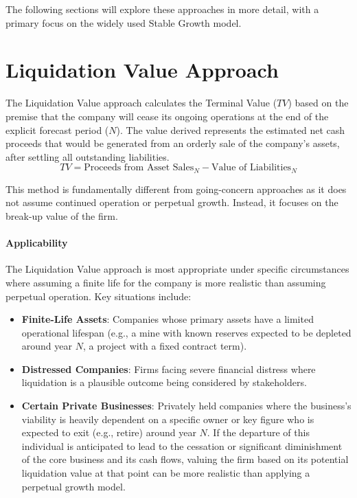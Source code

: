 The following sections will explore these approaches in more detail, with a primary focus on the widely used Stable Growth model.

\section{Liquidation Value Approach} \label{sec:liquidation_value}
The Liquidation Value approach calculates the Terminal Value (\(TV\)) based on the premise that the company will cease its ongoing operations at the end of the explicit forecast period (\(N\)). The value derived represents the estimated net cash proceeds that would be generated from an orderly sale of the company's assets, after settling all outstanding liabilities.
\[ TV = \text{Proceeds from Asset Sales}_N - \text{Value of Liabilities}_N \]

This method is fundamentally different from going-concern approaches as it does not assume continued operation or perpetual growth. Instead, it focuses on the break-up value of the firm.

\paragraph{Applicability}
The Liquidation Value approach is most appropriate under specific circumstances where assuming a finite life for the company is more realistic than assuming perpetual operation. Key situations include:
\begin{itemize}
    \item \textbf{Finite-Life Assets}: Companies whose primary assets have a limited operational lifespan (e.g., a mine with known reserves expected to be depleted around year \(N\), a project with a fixed contract term).
    \item \textbf{Distressed Companies}: Firms facing severe financial distress where liquidation is a plausible outcome being considered by stakeholders.
    \item \textbf{Certain Private Businesses}: Privately held companies where the business's viability is heavily dependent on a specific owner or key figure who is expected to exit (e.g., retire) around year \(N\). If the departure of this individual is anticipated to lead to the cessation or significant diminishment of the core business and its cash flows, valuing the firm based on its potential liquidation value at that point can be more realistic than applying a perpetual growth model.
\end{itemize}

